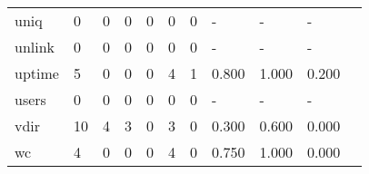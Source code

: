 \begin{longtable}{lp{1.2cm}p{1.2cm}p{1.2cm}p{1.2cm}p{1.2cm}p{1.2cm}p{1.2cm}p{1.2cm}p{1.2cm}p{1.2cm}}
uniq      &                                     0 &                                                  0 &                                                0 &                                               0 &                                                0 &                                              0 &                                             - &                                                  - &                                                  - \\
unlink    &                                     0 &                                                  0 &                                                0 &                                               0 &                                                0 &                                              0 &                                             - &                                                  - &                                                  - \\
uptime    &                                     5 &                                                  0 &                                                0 &                                               0 &                                                4 &                                              1 &                                         0.800 &                                              1.000 &                                              0.200 \\
users     &                                     0 &                                                  0 &                                                0 &                                               0 &                                                0 &                                              0 &                                             - &                                                  - &                                                  - \\
vdir      &                                    10 &                                                  4 &                                                3 &                                               0 &                                                3 &                                              0 &                                         0.300 &                                              0.600 &                                              0.000 \\
wc        &                                     4 &                                                  0 &                                                0 &                                               0 &                                                4 &                                              0 &                                         0.750 &                                              1.000 &                                              0.000 \\

\end{longtable}
